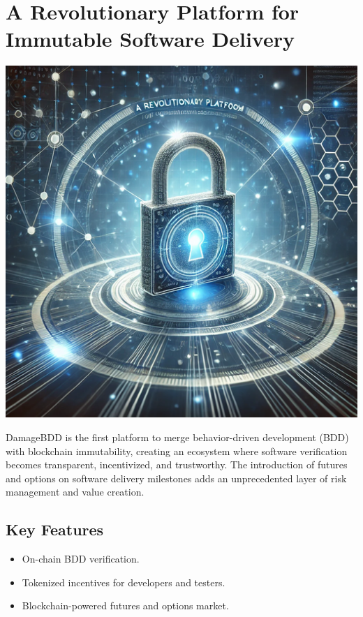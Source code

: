 \documentclass[12pt,a4paper]{article}
\begin{document}
\section{A Revolutionary Platform for Immutable Software Delivery}
\includegraphics[width=\textwidth]{compressed/immutable_software_delivery.png} %
\begin{highlighted}
DamageBDD is the first platform to merge behavior-driven development (BDD) with blockchain immutability, creating an ecosystem where software verification becomes transparent, incentivized, and trustworthy. The introduction of futures and options on software delivery milestones adds an unprecedented layer of risk management and value creation.
\end{highlighted}

\subsection{Key Features}
\begin{itemize}
    \item On-chain BDD verification.
    \item Tokenized incentives for developers and testers.
    \item Blockchain-powered futures and options market.
\end{itemize}
\end{document}
